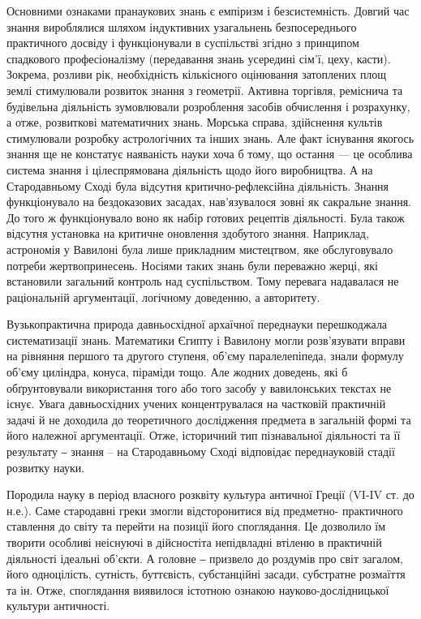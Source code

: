 Основними ознаками пранаукових знань є емпіризм і безсистемність.
Довгий час знання вироблялися шляхом індуктивних узагальнень
безпосереднього практичного досвіду і функціонували в суспільстві згідно з
принципом спадкового професіоналізму (передавання знань усередині сім’ї,
цеху, касти). Зокрема, розливи рік, необхідність кількісного оцінювання
затоплених площ землі стимулювали розвиток знання з геометрії. Активна
торгівля, реміснича та будівельна діяльність зумовлювали розроблення засобів
обчислення і розрахунку, а отже, розвиткові математичних знань. Морська
справа, здійснення культів стимулювали розробку астрологічних та інших
знань. Але факт існування якогось знання ще не констатує наяваність науки
хоча б тому, що остання --- це особлива система знання і цілеспрямована
діяльність щодо його виробництва. А на Стародавньому Сході була відсутня
критично-рефлексійна діяльність. Знання функціонувало на бездоказових
засадах, нав’язувалося зовні як сакральне знання. До того ж функціонувало
воно як набір готових рецептів діяльності. Була також відсутня установка на
критичне оновлення здобутого знання. Наприклад, астрономія у Вавилоні була
лише прикладним мистецтвом, яке обслуговувало потреби жертвопринесень.
Носіями таких знань були переважно жерці, які встановили загальний контроль
над суспільством. Тому перевага надавалася не раціональній аргументації,
логічному доведенню, а авторитету.

Вузькопрактична природа давньосхідної архаїчної переднауки
перешкоджала систематизації знань. Математики Єгипту і Вавилону могли
розв’язувати вправи на рівняння першого та другого ступеня, об’єму
паралелепіпеда, знали формулу об’єму циліндра, конуса, піраміди тощо. Але
жодних доведень, які б обґрунтовували використання того або того засобу у
вавилонських текстах не існує. Увага давньосхідних учених концентрувалася на
частковій практичній задачі й не доходила до теоретичного дослідження
предмета в загальній формі та його належної аргументації. Отже, історичний
тип пізнавальної діяльності та її результату ‒ знання – на Стародавньому Сході
відповідає переднауковій стадії розвитку науки.

Породила науку в період власного розквіту культура античної Греції (VI-IV
ст. до н.е.). Саме стародавні греки змогли відсторонитися від предметно-
практичного ставлення до світу та перейти на позиції його споглядання. Це
дозволило їм творити особливі неіснуючі в дійсностіта непідвладні втіленю в
практичній діяльності ідеальні об’єкти. А головне ‒ призвело до роздумів про
світ загалом, його одноцілість, сутність, буттєвість, субстанційні засади,
субстратне розмаїття та ін. Отже, споглядання виявилося істотною ознакою
науково-дослідницької культури античності.

